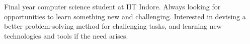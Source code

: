 

\begin{cvparagraph}

Final year computer science student at IIT Indore. Always looking for opportunities to learn something new and challenging. Interested in devising a better problem-solving method for challenging tasks, and learning new technologies and tools if the need arises.
\end{cvparagraph}
